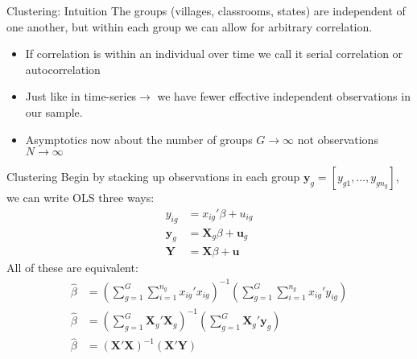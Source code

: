 \begin{frame}{Clustering: Intuition}
The groups (villages, classrooms, states) are independent of one another, but within each group we can allow for arbitrary correlation.
\begin{itemize}
\item If correlation is within an individual over time we call it \alert{serial correlation} or \alert{autocorrelation}
\item Just like in time-series$\rightarrow$ we have fewer effective independent observations in our sample.
\item Asymptotics now about the number of groups $G \rightarrow \infty$ not observations $N \rightarrow \infty$
\end{itemize}
\end{frame}

\begin{frame}{Clustering}
Begin by stacking up observations in each group $\mathbf{y}_{g }  = [y_{g1},\ldots,y_{g n_g}]$, we can write OLS three ways:
\begin{align*}
y_{ig } &= x_{ig}' \beta + u_{ig}\\
\mathbf{y}_{g } &= \mathbf{X}_{g} \beta + \mathbf{u}_{g}\\
\mathbf{Y} &= \mathbf{X} \beta + \mathbf{u}
\end{align*}
All of these are equivalent:
\begin{align*}
\widehat {  \beta  } &= \left( \sum _ { g = 1 } ^ { G } \sum _ { i = 1 } ^ { n _ { g } } x _ { i g }' { x } _ { i g } \right) ^ { - 1 } \left( \sum _ { g = 1 } ^ { G } \sum _ { i = 1 } ^ { n _ { g } } x _ { i g }' y _ { i g } \right)\\
\widehat {  \beta  }  &=  \left(  \sum _ { g = 1 } ^ { G } \mathbf{X}_g' \mathbf{X}_g \right)^{-1} \left(  \sum _ { g = 1 } ^ { G } \mathbf{X}_g' \mathbf{y}_g \right)\\
\widehat {  \beta  }  &=  \left( \mathbf{X}' \mathbf{X} \right)^{-1} \left(   \mathbf{X}' \mathbf{Y} \right)\\
\end{align*}
\end{frame}

